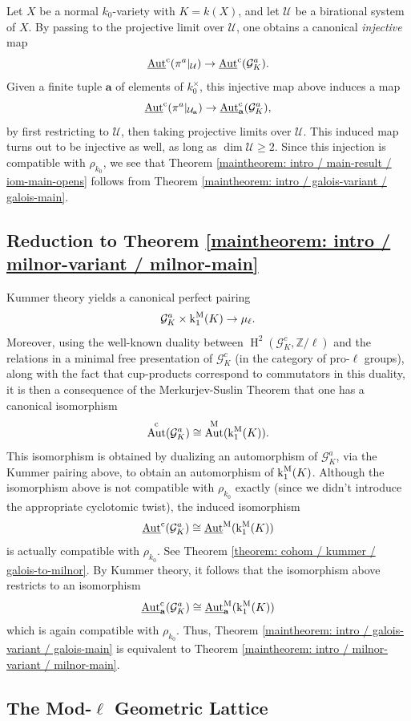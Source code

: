 \documentclass[11pt]{amsart}
\theoremstyle{definition}
\theoremstyle{remark}
\numberwithin{equation}{section}
\DeclareMathOperator{\Aut}{Aut}
\renewcommand{\H}{\operatorname{H}}
\newcommand{\Z}{\mathbb{Z}}
\newcommand{\Gc}{\mathcal{G}}
\newcommand{\Ucal}{\mathcal{U}}
\newcommand{\abf}{\mathbf{a}}
\newcommand{\Autm}{\Aut^{\rm M}}
\newcommand{\Autc}{\Aut^{\rm c}}
\newcommand{\UAutc}{\underline{\Aut}^{\rm c}}
\newcommand{\UAutm}{\underline{\Aut}^{\rm M}}
\renewcommand{\k}{\operatorname{k}^{\rm M}}
\begin{document}
Let $X$ be a normal $k_0$-variety with $K = k(X)$, and let $\Ucal$ be a birational system of $X$.
By passing to the projective limit over $\Ucal$, one obtains a canonical \emph{injective} map
\[ \UAutc(\pi^a|_\Ucal) \rightarrow \UAutc(\Gc_K^a). \]
Given a finite tuple $\abf$ of elements of $k_0^\times$, this injective map above induces a map
\[ \UAutc(\pi^a|_{\Ucal_\abf}) \rightarrow \UAutc_\abf(\Gc_K^a), \]
by first restricting to $\Ucal$, then taking projective limits over $\Ucal$.
This induced map turns out to be injective as well, as long as $\dim \Ucal \geq 2$.
Since this injection is compatible with $\rho_{k_0}$, we see that Theorem \ref{maintheorem: intro / main-result / iom-main-opens} follows from Theorem \ref{maintheorem: intro / galois-variant / galois-main}.

\subsection{Reduction to Theorem \ref{maintheorem: intro / milnor-variant / milnor-main}}

Kummer theory yields a canonical perfect pairing
\[ \Gc_K^a \times \k_1(K) \rightarrow \mu_\ell. \]
Moreover, using the well-known duality between $\H^2(\Gc_K^c,\Z/\ell)$ and the relations in a minimal free presentation of $\Gc_K^c$ (in the category of pro-$\ell$ groups), along with the fact that cup-products correspond to commutators in this duality, it is then a consequence of the Merkurjev-Suslin Theorem \cite{Merkurjev:1982} that one has a canonical isomorphism
\[ \Autc(\Gc_K^a) \cong \Autm(\k_1(K)). \]
This isomorphism is obtained by dualizing an automorphism of $\Gc_K^a$, via the Kummer pairing above, to obtain an automorphism of $\k_1(K)$.
Although the isomorphism above is not compatible with $\rho_{k_0}$ exactly (since we didn't introduce the appropriate cyclotomic twist), the induced isomorphism 
\[ \UAutc(\Gc_K^a) \cong \UAutm(\k_1(K)) \] 
is actually compatible with $\rho_{k_0}$.
See Theorem \ref{theorem: cohom / kummer / galois-to-milnor}.
By Kummer theory, it follows that the isomorphism above restricts to an isomorphism
\[ \UAutc_\abf(\Gc_K^a) \cong \UAutm_\abf(\k_1(K)) \]
which is again compatible with $\rho_{k_0}$.
Thus, Theorem \ref{maintheorem: intro / galois-variant / galois-main} is equivalent to Theorem \ref{maintheorem: intro / milnor-variant / milnor-main}.

\subsection{The Mod-$\ell$ Geometric Lattice}
\end{document}
